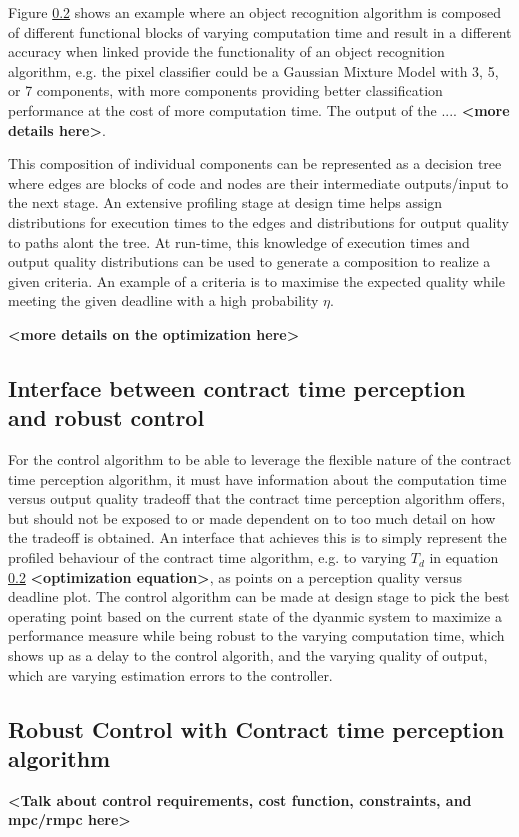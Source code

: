 Figure \ref{} shows an example where an object recognition algorithm is composed of different functional blocks of varying computation time and result in a different accuracy when linked provide the functionality of an object recognition algorithm, e.g. the pixel classifier could be a Gaussian Mixture Model with 3, 5, or 7 components, with more components providing better classification performance at the cost of more computation time. The output of the .... \textbf{<more details here>}. 

This composition of individual components can be represented as a decision tree where edges are blocks of code and nodes are their intermediate outputs/input to the next stage. An extensive profiling stage at design time helps assign distributions for execution times to the edges and distributions for output quality to paths alont the tree. At run-time, this knowledge of execution times and output quality distributions can be used to generate a composition to realize a given criteria. An example of a criteria is to maximise the expected quality while meeting the given deadline with a high probability $\eta$.  

\textbf{<more details on the optimization here>}

\subsection{Interface between contract time perception and robust control}

For the control algorithm to be able to leverage the flexible nature of the contract time perception algorithm, it must have information about the computation time versus output quality tradeoff that the contract time perception algorithm offers, but should not be exposed to or made dependent on to too much detail on how the tradeoff is obtained. An interface that achieves this is to simply represent the profiled behaviour of the contract time algorithm, e.g. to varying $T_d$ in equation \ref{} \textbf{<optimization equation>}, as points on a perception quality versus deadline plot. The control algorithm can be made at design stage to pick the best operating point based on the current state of the dyanmic system to maximize a performance measure while being robust to the varying computation time, which shows up as a delay to the control algorith, and the varying quality of output, which are varying estimation errors to the controller.

\subsection{Robust Control with Contract time perception algorithm}

\textbf{<Talk about control requirements, cost function, constraints, and mpc/rmpc here>}





